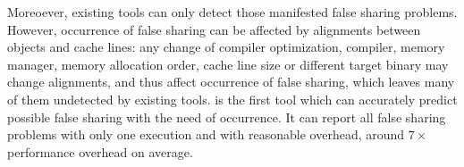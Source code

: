 Moreoever, existing tools can only detect those manifested false sharing problems.
However, occurrence of false sharing can be affected by alignments between
objects and cache lines: any change of compiler optimization, compiler, memory manager, 
memory allocation order, cache line size or different target binary 
may change alignments, and thus affect occurrence of false sharing, 
which leaves many of them undetected by existing tools.
\Predator{} is the first tool which can accurately predict possible false sharing 
with the need of occurrence. 
It can report all false sharing problems with only one execution and with reasonable overhead, 
around $7\times$ performance overhead on average.

